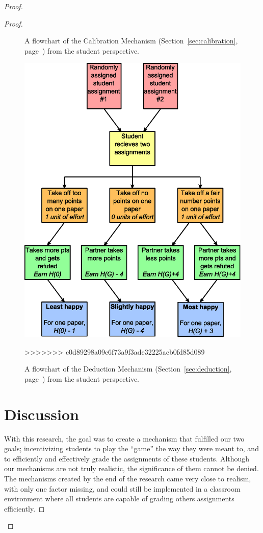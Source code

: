 \documentclass[12pt, Arial]{article}
\begin{document}
\begin{proof}
\begin{proof}
{\begin{figure}
		\caption {A flowchart of the Calibration Mechanism (Section~\ref{sec:calibration}, page~\pageref{sec:calibration}) from the student perspective.\label{fig:calibration}}
\end{figure}
\begin{figure}
	\centering
		\includegraphics[width=\textwidth]{Flowchart-Deduction.eps}
		\caption {A flowchart of the Deduction Mechanism (Section~\ref{sec:deduction}, page~\pageref{sec:deduction}) from the student perspective.\label{fig:deduction}}
>>>>>>> c0d89298a09e6f73a9f3ade32225acb0fd85d089
\end{figure}
}
\section{Discussion}
With this research, the goal was to create a mechanism that fulfilled our two goals; incentivizing students to play the ``game'' the way they were meant to, and to efficiently and effectively grade the assignments of these students. Although our mechanisms are not truly realistic, the significance of them cannot be denied. The mechanisms created by the end of the research came very close to realism, with only one factor missing, and could still be implemented in a classroom environment where all students are capable of grading others assignments efficiently.


\end{proof}
\end{proof}
\end{document}
